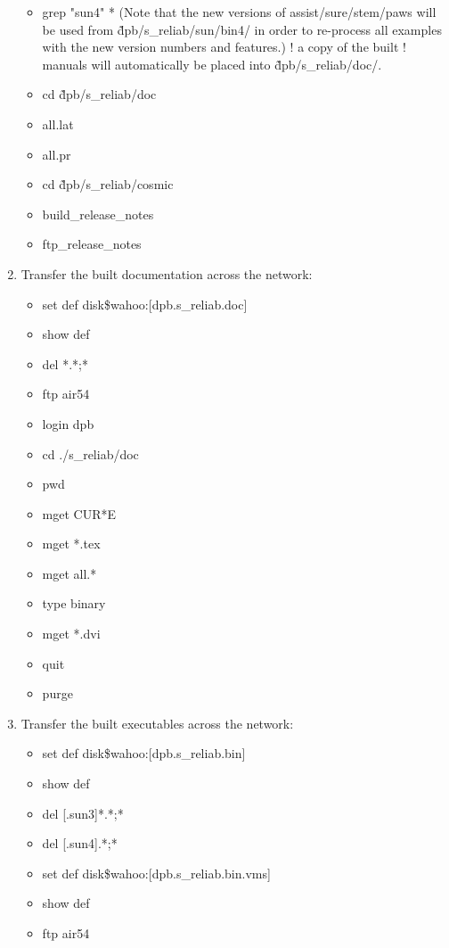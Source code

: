 \begin{enumerate}
\begin{itemize}
      \item grep "sun4" *
          (Note that the new versions of assist/sure/stem/paws will be used
          from \~dpb/s\_reliab/sun/bin4/ in order to re-process all examples
          with the new version numbers and features.)
!  a copy of the built
!  manuals will automatically be placed into \~dpb/s\_reliab/doc/.
      \item cd \~dpb/s\_reliab/doc
      \item all.lat
      \item all.pr
      \item cd \~dpb/s\_reliab/cosmic
      \item build\_release\_notes
      \item ftp\_release\_notes
      \end{itemize}
   \item Transfer the built documentation across the network:
      \begin{itemize}
      \item set def disk\$wahoo:[dpb.s\_reliab.doc]
      \item show def
      \item del *.*;*
      \item ftp air54
      \item login dpb
      \item cd ./s\_reliab/doc
      \item pwd
      \item mget CUR*E
      \item mget *.tex
      \item mget all.*
      \item type binary
      \item mget *.dvi
      \item quit
      \item purge
      \end{itemize}
   \item Transfer the built executables across the network:
      \begin{itemize}
      \item set def disk\$wahoo:[dpb.s\_reliab.bin]
      \item show def
      \item del [.sun3]*.*;*
      \item del [.sun4].*;*
      \item set def disk\$wahoo:[dpb.s\_reliab.bin.vms]
      \item show def
      \item ftp air54

\end{itemize}
\end{enumerate}
